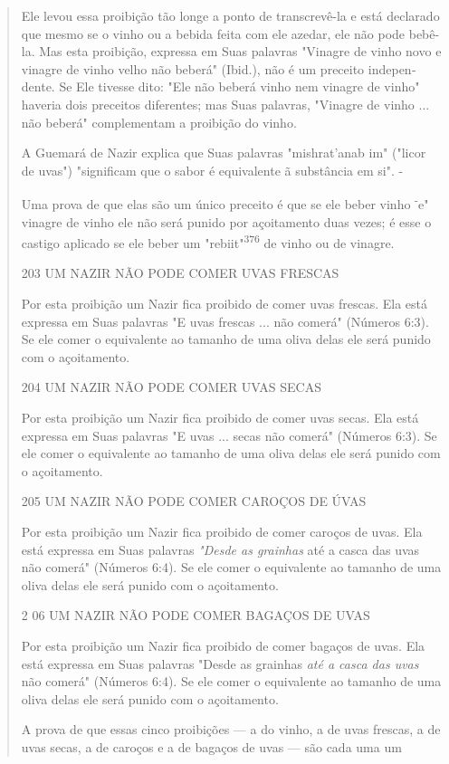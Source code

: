 \begin{quote}Ele levou essa proibição tão longe a ponto de transcrevê-la e está
declarado que mesmo se o vinho ou a bebida feita com ele azedar, ele não
po­de bebê-la. Mas esta proibição, expressa em Suas palavras "Vinagre de
vinho novo e vinagre de vinho velho não beberá" (Ibid.), não é um
preceito indepen­dente. Se Ele tivesse dito: "Ele não beberá vinho nem
vinagre de vinho" have­ria dois preceitos diferentes; mas Suas palavras,
"Vinagre de vinho ... não be­berá" complementam a proibição do vinho.

A Guemará de Nazir explica que Suas palavras "mishrat'anab im" ("li­cor
de uvas") "significam que o sabor é equivalente ã substância em si". -

Uma prova de que elas são um único preceito é que se ele beber vi­nho
\textsuperscript{-}e" vinagre de vinho ele não será punido por
açoitamento duas vezes; é esse o castigo aplicado se ele beber um
"rebiit"\textsuperscript{376} de vinho ou de vinagre.

203 UM NAZIR NÃO PODE COMER UVAS FRESCAS

Por esta proibição um Nazir fica proibido de comer uvas frescas. Ela
está expressa em Suas palavras "E uvas frescas ... não comerá" (Números
6:3). Se ele comer o equivalente ao tamanho de uma oliva delas ele será
punido com o açoitamento.

204 UM NAZIR NÃO PODE COMER UVAS SECAS

Por esta proibição um Nazir fica proibido de comer uvas secas. Ela está
expressa em Suas palavras "E uvas ... secas não comerá" (Números 6:3).
Se ele comer o equivalente ao tamanho de uma oliva delas ele será punido
com o açoitamento.

205 UM NAZIR NÃO PODE COMER CAROÇOS DE ÚVAS

Por esta proibição um Nazir fica proibido de comer caroços de uvas. Ela
está expressa em Suas palavras \emph{"Desde as grainhas} até a casca das
uvas não comerá" (Números 6:4). Se ele comer o equivalente ao tamanho de
uma oliva delas ele será punido com o açoitamento.

2 06 UM NAZIR NÃO PODE COMER BAGAÇOS DE UVAS

Por esta proibição um Nazir fica proibido de comer bagaços de uvas. Ela
está expressa em Suas palavras "Desde as grainhas \emph{até a casca das
uvas} não comerá" (Números 6:4). Se ele comer o equivalente ao tamanho
de uma oliva delas ele será punido com o açoitamento.

A prova de que essas cinco proibições --- a do vinho, a de uvas
fres­cas, a de uvas secas, a de caroços e a de bagaços de uvas --- são
cada uma um


\end{quote}
